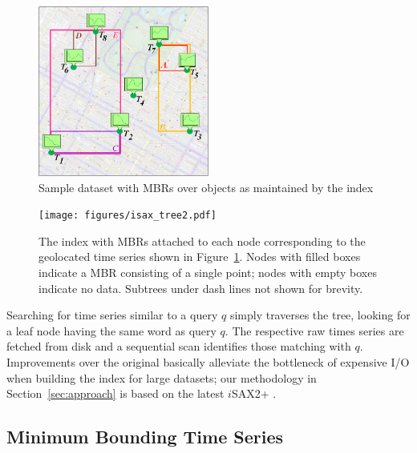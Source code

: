 \begin{figure}[t]
	\centering
	\includegraphics[width=0.5\textwidth]{figures/geoISAX_mbr.png}
	\caption{Sample dataset with MBRs over objects as maintained by the \hisax index}
	\label{fig:sample}
\end{figure}

\begin{figure}[t]
	\centering
	\texttt{[image: figures/isax\_tree2.pdf]}
	\caption{The \hisax index with MBRs attached to each node corresponding to the geolocated time series shown in Figure~\ref{fig:sample}. Nodes with filled boxes indicate a MBR consisting of a single point; nodes with empty boxes indicate no data. Subtrees under dash lines not shown for brevity.}
	\label{fig:isaxtree}
\end{figure}

Searching for time series similar to a query $q$ simply traverses the \isax tree, looking for a leaf node having the same \isax word as query $q$. The respective raw times series are fetched from disk and a sequential scan identifies those matching with $q$. Improvements over the original \isax basically alleviate the bottleneck of expensive I/O when building the index for large datasets; our methodology in Section~\ref{sec:approach} is based on the latest $i$SAX2+ \cite{camerra2014kais}.

\subsection{Minimum Bounding Time Series}
\label{subsec:mbts}

